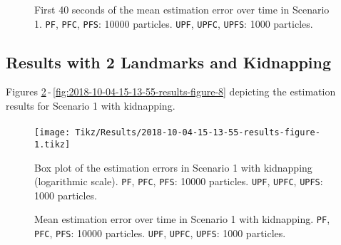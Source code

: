 \begin{figure}
	\centering
	\setlength{} 	
	\setlength\figurewidth{0.9\textheight}		
	\caption[First 40 seconds of the mean estimation error over time in Scenario 1. \texttt{PF}, \texttt{PFC}, \texttt{PFS}: 10000 particles. \texttt{UPF}, \texttt{UPFC}, \texttt{UPFS}: 1000 particles.]{First 40 seconds of the mean estimation error over time in Scenario 1. \texttt{PF}, \texttt{PFC}, \texttt{PFS}: 10000 particles. \texttt{UPF}, \texttt{UPFC}, \texttt{UPFS}: 1000 particles.}
	\label{fig:2018-09-30-12-09-00-results-figure-7}			
\end{figure}


\subsection{Results with 2 Landmarks and Kidnapping}

Figures \ref{fig:2018-10-04-15-13-55-results-figure-1}\,-\,\ref{fig:2018-10-04-15-13-55-results-figure-8} depicting the estimation results for Scenario 1 with kidnapping.

\paragraph{}


\begin{figure}[h!]
	\centering
	\setlength\figureheight{0.8\textheight} 	
	\setlength{}		
	\texttt{[image: Tikz/Results/2018-10-04-15-13-55-results-figure-1.tikz]}			
	\caption[Box plot of the estimation errors in Scenario 1 with kidnapping. \texttt{PF}, \texttt{PFC}, \texttt{PFS}: 10000 particles. \texttt{UPF}, \texttt{UPFC}, \texttt{UPFS}: 1000 particles.]{Box plot of the estimation errors in Scenario 1 with kidnapping (logarithmic scale). \texttt{PF}, \texttt{PFC}, \texttt{PFS}: 10000 particles. \texttt{UPF}, \texttt{UPFC}, \texttt{UPFS}: 1000 particles.}
	\label{fig:2018-10-04-15-13-55-results-figure-1}			
\end{figure}

\begin{figure}
	\centering
	\setlength{} 	
	\setlength\figurewidth{0.9\textheight}		
	\caption[Mean estimation error over time in Scenario 1 with kidnapping. \texttt{PF}, \texttt{PFC}, \texttt{PFS}: 10000 particles. \texttt{UPF}, \texttt{UPFC}, \texttt{UPFS}: 1000 particles.]{Mean estimation error over time in Scenario 1 with kidnapping. \texttt{PF}, \texttt{PFC}, \texttt{PFS}: 10000 particles. \texttt{UPF}, \texttt{UPFC}, \texttt{UPFS}: 1000 particles.}
	\label{fig:2018-10-04-15-13-55-results-figure-6}			
\end{figure}


